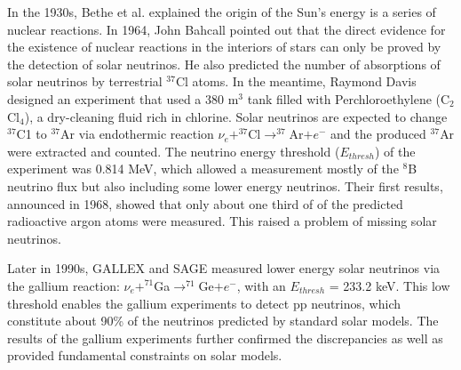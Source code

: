\documentclass[preprint,12pt]{elsarticle}
\numberwithin{equation}{section}
\begin{document}
In the 1930s, Bethe et al. explained the origin of the Sun's energy is a series of nuclear reactions\cite{bethe2}. In 1964, John Bahcall pointed out that the direct evidence for the existence of nuclear reactions in the interiors of stars can only be proved by the detection of solar neutrinos. He also predicted the number of absorptions of solar neutrinos by terrestrial $^{37}$Cl atoms\cite{bahcall1}. In the meantime, Raymond Davis designed an experiment that used a 380 m$^3$ tank filled with Perchloroethylene (C$_2$Cl$_4$), a dry-cleaning fluid rich in chlorine. Solar neutrinos are expected to change $^{37}$C1 to $^{37}$Ar via endothermic reaction $\nu_e+^{37}$Cl$\to^{37}$Ar$+e^-$ and the produced $^{37}$Ar were extracted and counted. The neutrino energy threshold ($E_{thresh}$) of the experiment was 0.814 MeV, which allowed a measurement mostly of the $^8$B neutrino flux but also including some lower energy neutrinos\cite{raymond}. Their first results, announced in 1968, showed that only about one third of of the predicted radioactive argon atoms were measured. This raised a problem of missing solar neutrinos. 

Later in 1990s, GALLEX and SAGE measured lower energy solar neutrinos via the gallium reaction: $\nu_e+^{71}$Ga$\to^{71}$Ge$+e^-$, with an $E_{thresh}$ = 233.2 keV. This low threshold enables the gallium experiments to detect pp neutrinos, which constitute about 90\% of the neutrinos predicted by standard solar models. The results of the gallium experiments further confirmed the discrepancies as well as provided fundamental constraints on solar models\cite{GALLEX,SAGE,bahcall2}.
\end{document}
